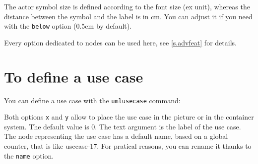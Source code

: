 \documentclass[a4paper,11pt]{report}
\begin{document}
\medskip

\begin{minipage}{0.5\textwidth}

\end{minipage}
\begin{minipage}{0.5\textwidth}
\begin{center}
\end{center}
\end{minipage}

\medskip

The actor symbol size is defined according to the font size (ex unit), whereas the distance between the symbol and the label is in cm. You can adjust it if you need with the {\tt below} option (0.5cm by default).

\medskip
 
\begin{minipage}{0.5\textwidth}

\end{minipage}
\begin{minipage}{0.5\textwidth}
\begin{center}
\end{center}
\end{minipage}

Every \TikZ{} option dedicated to nodes can be used here, see \autoref{s.advfeat} for details.

\section{To define a use case}\label{s.usecase}

You can define a use case with the {\tt umlusecase} command:

\medskip

\begin{minipage}{0.5\textwidth}

\end{minipage}
\begin{minipage}{0.5\textwidth}
\begin{center}
\end{center}
\end{minipage}

\medskip

Both options {\tt x} and {\tt y} allow to place the use case in the picture or in the container system. The default value is 0. The text argument is the label of the use case. The node representing the use case has a default name, based on a global counter, that is like usecase-17. For pratical reasons, you can rename it thanks to the {\tt name} option.
\end{document}
